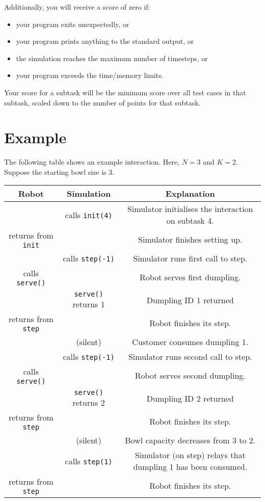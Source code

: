 \documentclass{article}
\begin{document}
Additionally, you will receive a score of zero if:
\begin{itemize}
\item your program exits unexpectedly, or
\item your program prints anything to the standard output, or
\item the simulation reaches the maximum number of timesteps, or
\item your program exceeds the time/memory limits.
\end{itemize}

\noindent Your score for a subtask will be the minimum score over all test cases in that subtask, scaled down to the number of points for that subtask.

\section*{Example}

The following table shows an example interaction. Here, $N = 3$ and $K = 2$. Suppose the starting bowl size is 3.

\begin{tabular}{ccc}
Robot & Simulation & Explanation \\
\hline
 & calls {\tt init(4)} & Simulator initialises the interaction on subtask 4. \\
returns from {\tt init} & & Simulator finishes setting up. \\
 & calls {\tt step(-1)} & Simulator runs first call to step. \\
calls {\tt serve()} & & Robot serves first dumpling. \\
 & {\tt serve()} returns 1 & Dumpling ID 1 returned \\
returns from {\tt step} & & Robot finishes its step. \\
 & (silent) & Customer consumes dumpling 1. \\
 & calls {\tt step(-1)} & Simulator runs second call to step. \\
calls {\tt serve()} & & Robot serves second dumpling. \\
 & {\tt serve()} returns 2 & Dumpling ID 2 returned \\
returns from {\tt step} & & Robot finishes its step. \\
 & (silent) & Bowl capacity decreases from 3 to 2. \\
 & calls {\tt step(1)} & Simulator (on step) relays that dumpling 1 has been consumed. \\
returns from {\tt step} & & Robot finishes its step. \\
\end{tabular}
\end{document}
